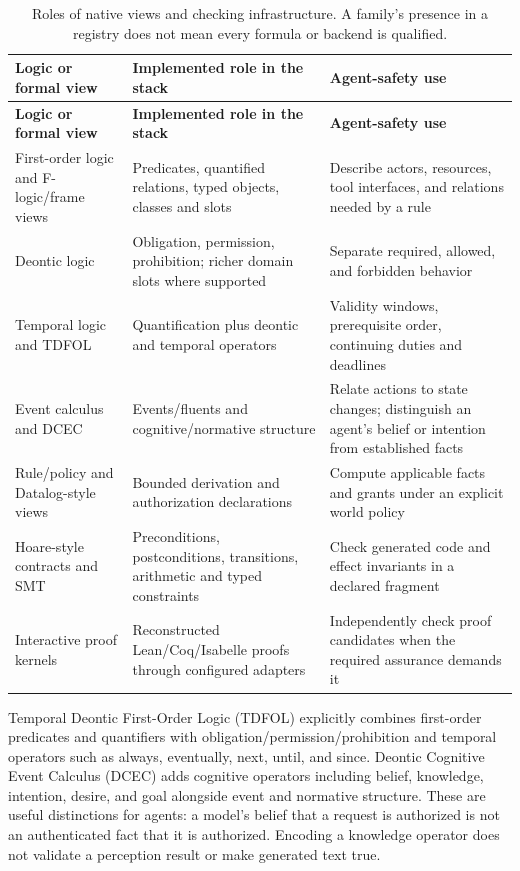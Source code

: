 \documentclass{article}
\begin{document}
\begin{longtable}{@{}>{\raggedright\arraybackslash}p{.24\linewidth} >{\raggedright\arraybackslash}p{.32\linewidth} >{\raggedright\arraybackslash}p{.38\linewidth}@{}}
\caption{Roles of native views and checking infrastructure. A family's presence in a registry does not mean every formula or backend is qualified.}\label{tab:2}\\
\toprule
\textbf{Logic or formal view} & \textbf{Implemented role in the stack} & \textbf{Agent-safety use} \\
\midrule
\endfirsthead
\textbf{Logic or formal view} & \textbf{Implemented role in the stack} & \textbf{Agent-safety use} \\
\midrule
\endhead
\bottomrule
\endlastfoot
First-order logic and F-logic/frame views & Predicates, quantified relations, typed objects, classes and slots & Describe actors, resources, tool interfaces, and relations needed by a rule \\[3pt]
Deontic logic & Obligation, permission, prohibition; richer domain slots where supported & Separate required, allowed, and forbidden behavior \\[3pt]
Temporal logic and TDFOL & Quantification plus deontic and temporal operators & Validity windows, prerequisite order, continuing duties and deadlines \\[3pt]
Event calculus and DCEC & Events/fluents and cognitive/normative structure & Relate actions to state changes; distinguish an agent's belief or intention from established facts \\[3pt]
Rule/policy and Datalog-style views & Bounded derivation and authorization declarations & Compute applicable facts and grants under an explicit world policy \\[3pt]
Hoare-style contracts and SMT & Preconditions, postconditions, transitions, arithmetic and typed constraints & Check generated code and effect invariants in a declared fragment \\[3pt]
Interactive proof kernels & Reconstructed Lean/Coq/Isabelle proofs through configured adapters & Independently check proof candidates when the required assurance demands it \\[3pt]
\end{longtable}
\endgroup


Temporal Deontic First-Order Logic (TDFOL) explicitly combines first-order predicates and quantifiers with obligation/permission/prohibition and temporal operators such as always, eventually, next, until, and since. Deontic Cognitive Event Calculus (DCEC) adds cognitive operators including belief, knowledge, intention, desire, and goal alongside event and normative structure. These are useful distinctions for agents: a model's belief that a request is authorized is not an authenticated fact that it is authorized. Encoding a knowledge operator does not validate a perception result or make generated text true.
\end{document}

